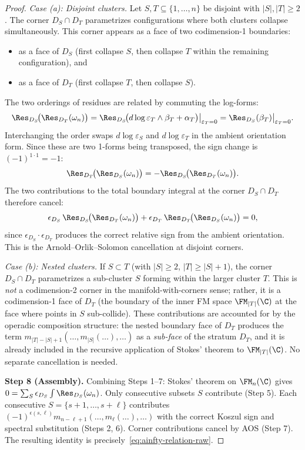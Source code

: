 \begin{proof}
\emph{Case (a): Disjoint clusters.} Let $S, T \subseteq \{1,\ldots,n\}$ be disjoint with $|S|, |T| \geq 2$. The corner $D_S \cap D_T$ parametrizes configurations where both clusters collapse simultaneously. This corner appears as a face of two codimension-1 boundaries:
\begin{itemize}
\item as a face of $D_S$ (first collapse $S$, then collapse $T$ within the remaining configuration), and
\item as a face of $D_T$ (first collapse $T$, then collapse $S$).
\end{itemize}
The two orderings of residues are related by commuting the log-forms:
\[
\Res_{D_S}\!\bigl(\Res_{D_T}(\omega_n)\bigr)
= \Res_{D_S}\!\bigl(d\log\varepsilon_T \wedge \beta_T + \alpha_T\bigr)\big|_{\varepsilon_T=0}
= \Res_{D_S}(\beta_T)\big|_{\varepsilon_T=0}.
\]
Interchanging the order swaps $d\log\varepsilon_S$ and $d\log\varepsilon_T$ in the ambient orientation form. Since these are two 1-forms being transposed, the sign change is $(-1)^{1 \cdot 1} = -1$:
\[
\Res_{D_T}\!\bigl(\Res_{D_S}(\omega_n)\bigr) = -\Res_{D_S}\!\bigl(\Res_{D_T}(\omega_n)\bigr).
\]
The two contributions to the total boundary integral at the corner $D_S \cap D_T$ therefore cancel:
\[
\epsilon_{D_S}\,\Res_{D_S}\!\bigl(\Res_{D_T}(\omega_n)\bigr) + \epsilon_{D_T}\,\Res_{D_T}\!\bigl(\Res_{D_S}(\omega_n)\bigr) = 0,
\]
since $\epsilon_{D_S} \cdot \epsilon_{D_T}$ produces the correct relative sign from the ambient orientation. This is the Arnold--Orlik--Solomon cancellation at disjoint corners.

\emph{Case (b): Nested clusters.} If $S \subset T$ (with $|S| \geq 2$, $|T| \geq |S| + 1$), the corner $D_S \cap D_T$ parametrizes a sub-cluster $S$ forming within the larger cluster $T$. This is \emph{not} a codimension-2 corner in the manifold-with-corners sense; rather, it is a codimension-1 face of $D_T$ (the boundary of the inner FM space $\FM_{|T|}(\C)$ at the face where points in $S$ sub-collide). These contributions are accounted for by the operadic composition structure: the nested boundary face of $D_T$ produces the term $m_{|T|-|S|+1}(\ldots, m_{|S|}(\ldots), \ldots)$ as a \emph{sub-face} of the stratum $D_T$, and it is already included in the recursive application of Stokes' theorem to $\FM_{|T|}(\C)$. No separate cancellation is needed.

\medskip
\textbf{Step 8 (Assembly).}
Combining Steps 1--7: Stokes' theorem on $\FM_n(\C)$ gives $0 = \sum_S \epsilon_{D_S} \int \Res_{D_S}(\omega_n)$. Only consecutive subsets $S$ contribute (Step 5). Each consecutive $S = \{s{+}1,\ldots,s{+}\ell\}$ contributes $(-1)^{\epsilon(s,\ell)} m_{n-\ell+1}(\ldots, m_\ell(\ldots), \ldots)$ with the correct Koszul sign and spectral substitution (Steps 2, 6). Corner contributions cancel by AOS (Step 7). The resulting identity is precisely~\eqref{eq:ainfty-relation-raw}.
\end{proof}

